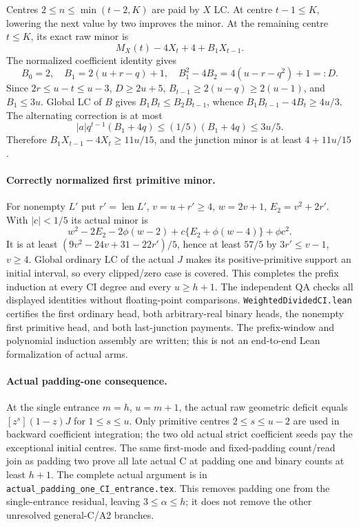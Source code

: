 Centres $2\le n\le\min(t-2,K)$ are paid by $X$ LC. At centre
$t-1\le K$, lowering the next value by two improves the minor.
At the remaining centre $t\le K$, its exact raw minor is
\[
                 M_X(t)-4X_t+4+B_1X_{t-1}.
\]
The normalized coefficient identity gives
\[
 B_0=2,\quad B_1=2(u+r-q)+1,\quad
 B_1^2-4B_2=4(u-r-q^2)+1=:D.
\]
Since $2r\le u-t\le u-3$,
$D\ge2u+5$, $B_{t-1}\ge2(u-q)\ge2(u-1)$, and $B_1\le3u$.
Global LC of $B$ gives $B_1B_t\le B_2B_{t-1}$, whence
$B_1B_{t-1}-4B_t\ge4u/3$.
The alternating correction is at most
\[
 |a|q^{t-1}(B_1+4q)\le(1/5)(B_1+4q)\le3u/5.
\]
Therefore $B_1X_{t-1}-4X_t\ge11u/15$, and the junction
minor is at least $4+11u/15$.

\paragraph{Correctly normalized first primitive minor.}
For nonempty $L'$ put $r'=\operatorname{len}L'$, $v=u+r'\ge4$,
$w=2v+1$, $E_2=v^2+2r'$. With $|c|<1/5$ its actual minor is
\[
 w^2-2E_2-2\phi(w-2)
       +c\{E_2+\phi(w-4)\}+\phi c^2.
\]
It is at least $(9v^2-24v+31-22r')/5$, hence at least $57/5$
by $3r'\le v-1$, $v\ge4$.
Global ordinary LC of the actual $J$ makes its positive-primitive
support an initial interval, so every clipped/zero case is covered.
This completes the prefix induction at every CI degree and every
$u\ge h+1$. The independent QA checks all displayed identities
without floating-point comparisons. \texttt{WeightedDividedCI.lean}
certifies the first ordinary head, both arbitrary-real binary heads,
the nonempty first primitive head, and both last-junction payments.
The prefix-window and polynomial induction assembly are written;
this is not an end-to-end Lean formalization of actual arms.

\paragraph{Actual padding-one consequence.}
At the single entrance $m=h$, $u=m+1$, the actual raw geometric
deficit equals $[z^s](1-z)J$ for $1\le s\le u$.
Only primitive centres $2\le s\le u-2$ are used in backward
coefficient integration; the two old actual strict coefficient
seeds pay the exceptional initial centres. The same first-mode
and fixed-padding count/read join as padding two prove
all late actual C at padding one and binary counts at least $h+1$.
The complete actual argument is in
\texttt{actual\_padding\_one\_CI\_entrance.tex}. This removes padding
one from the single-entrance residual, leaving $3\le\alpha\le h$;
it does not remove the other unresolved general-C/A2 branches.
